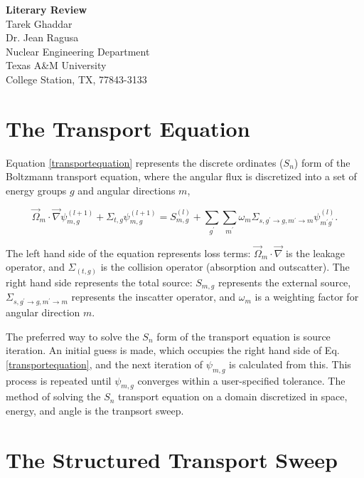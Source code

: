 \documentclass[11pt, letterpaper,titlepage,oneside]{article}
\newcommand{\titles}{\LARGE \textbf{Literary Review}}
\newcommand{\authors}{\normalsize Tarek Ghaddar \\ Dr. Jean Ragusa}
\newcommand{\department}{\normalsize Nuclear Engineering Department}
\newcommand{\university}{\normalsize Texas A\&M University}
\newcommand{\locations}{\normalsize College Station, TX, 77843-3133}
\begin{document}
\begin{titlepage}
\begin{center}
  \vspace*{3.81 cm}
  \titles\\
  \vspace*{4.445cm}
  \authors \\
  \vspace*{2.54cm} 
  \department \\
  \university \\
  \locations \\
\end{center}
\end{titlepage}

\section*{The Transport Equation}

Equation \ref{transportequation} represents the discrete ordinates ($S_n$) form of the Boltzmann transport equation, where the angular flux is discretized into a set of energy groups $g$ and angular directions $m$,

\begin{equation}
\vec{\Omega}_{m}\cdot \vec\nabla \psi^{(l+1)}_{m,g} + \Sigma_{t,g}\psi_{m,g}^{(l+1)} = S_{m,g}^{(l)} + \sum_{g^\prime}\sum_{m^{\prime}}\omega_m\Sigma_{s,g^{\prime}\to g,m^\prime\to m}\psi_{m^\prime g^\prime}^{(l)}.
\label{transportequation}
\end{equation}

The left hand side of the equation represents loss terms: $\vec{\Omega}_{m}\cdot \vec\nabla$ is the leakage operator, and $\Sigma_{(t,g)}$ is the collision operator (absorption and outscatter). The right hand side represents the total source: $S_{m,g}$ represents the external source, $\Sigma_{s,g^{\prime}\to g,m^\prime\to m}$ represents the inscatter operator, and $\omega_m$ is a weighting factor for angular direction $m$. 

The preferred way to solve the $S_n$ form of the transport equation is source iteration. An initial guess is made, which occupies the right hand side of Eq. \ref{transportequation}, and the next iteration of $\psi_{m,g}$ is calculated from this. This process is repeated until $\psi_{m,g}$ converges within a user-specified tolerance. The method of solving the $S_n$ transport equation on a domain discretized in space, energy, and angle is the tranpsort sweep.

\section*{The Structured Transport Sweep}
\end{document}
